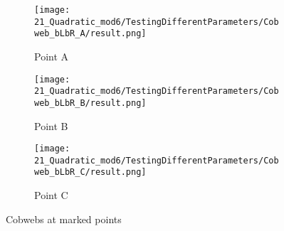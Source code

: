 \begin{figure}
    \centering
    \begin{subfigure}{0.3\textwidth}
        \centering
        \texttt{[image: 21\_Quadratic\_mod6/TestingDifferentParameters/Cobweb\_bLbR\_A/result.png]}
        \caption{Point A}
        \label{fig:quad.full.bLbR.CobwebA}
    \end{subfigure}
    \begin{subfigure}{0.3\textwidth}
        \centering
        \texttt{[image: 21\_Quadratic\_mod6/TestingDifferentParameters/Cobweb\_bLbR\_B/result.png]}
        \caption{Point B}
        \label{fig:quad.full.bLbR.CobwebB}
    \end{subfigure}
    \begin{subfigure}{0.3\textwidth}
        \centering
        \texttt{[image: 21\_Quadratic\_mod6/TestingDifferentParameters/Cobweb\_bLbR\_C/result.png]}
        \caption{Point C}
        \label{fig:quad.full.bLbR.CobwebC}
    \end{subfigure}
    \caption{Cobwebs at marked points}
    \label{fig:quad.full.bLbR.Cobwebs}
\end{figure}
